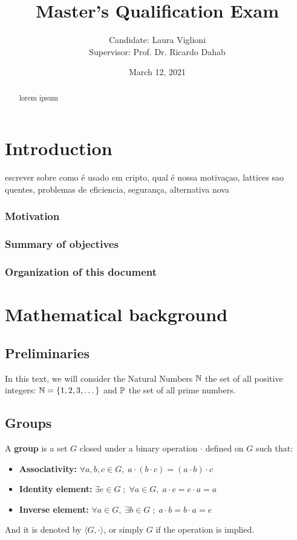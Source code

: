 \documentclass[a4paper,12pt]{article}
\author{Candidate: Laura Viglioni \\ Supervisor: Prof. Dr. Ricardo Dahab}
\date{March 12, 2021}
\title{Master’s Qualification Exam}
\begin{document}
\maketitle
\begin{abstract}
lorem ipsum
\end{abstract}
\pagebreak


\section{Introduction}
\label{sec:org896d7bd}
escrever sobre como é usado em cripto, qual é nossa motivaçao, lattices sao quentes, problemas de eficiencia, segurança, alternativa nova
\subsubsection*{Motivation}
\label{sec:org69ae6df}
\subsubsection*{Summary of objectives}
\label{sec:org8f301ca}
\subsubsection*{Organization of this document}
\label{sec:orgf561ba1}
\section{Mathematical background}
\label{sec:org83c7e4b}
\subsection{Preliminaries}
\label{sec:org169302c}
In this text, we will consider the Natural Numbers \(\N\) the set of all positive integers: \(\N = \{1,2,3,\dots\}\) and \(\P\) the set of all prime numbers. 
\subsection{Groups}
\label{sec:org55ef9ad}

\begin{definition}
  A \textbf{group} is a set $G$ closed under a binary operation $\cdot$ defined on $G$ such
  that:
  \begin{itemize}
  \item \textbf{Associativity: } $\forall a,b,c \in G, \; a\cdot(b\cdot c) = (a\cdot b)\cdot c$
  \item \textbf{Identity element: } $\exists e \in G \; ; \; \forall a \in G, \; a\cdot e = e\cdot a = a$
  \item \textbf{Inverse element: } $\forall a \in G, \; \exists b \in G \; ; \; a\cdot b = b \cdot a = e$
  \end{itemize}
And it is denoted by $\langle G,\cdot\rangle$, or simply $G$ if the operation is implied.
\end{definition}
\end{document}
